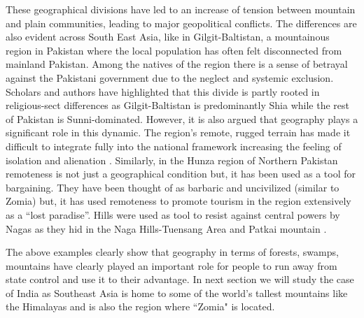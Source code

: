 \begin{sloppypar}
These geographical divisions have led to an increase of tension between mountain and plain communities,  leading to major geopolitical conflicts. The differences are also evident across South East Asia, like in Gilgit\hyp{}Baltistan, a mountainous region in Pakistan where the local population has often felt disconnected from mainland Pakistan. Among the natives of the region there is a sense of betrayal  against the Pakistani government due to the neglect and systemic exclusion. Scholars and authors have highlighted that this divide is partly rooted in religious\hyp{}sect differences as Gilgit\hyp{}Baltistan is predominantly Shia while the rest of Pakistan is  Sunni\hyp{}dominated. However, it is also argued that geography plays a significant role in this dynamic. The region's remote, rugged terrain has  made it difficult to integrate fully into the national framework  increasing the feeling of isolation and alienation \citep{ali2019delusional}. Similarly, in the Hunza region of Northern Pakistan  remoteness is not just a geographical condition but, it has been used as a tool for bargaining. They have been thought of as barbaric and uncivilized  (similar to Zomia) but, it has used remoteness to promote tourism in the region extensively as a \enquote{lost paradise}. Hills were used as tool to resist against central powers by Nagas as they hid in the Naga Hills\hyp{}Tuensang Area and Patkai mountain \citep{kapai2020spatial}.  

The above examples clearly show that geography in terms of forests, swamps, mountains have clearly played an important role for people to run away from state control and use it to their advantage. In next section we will study the case of India as Southeast Asia is home to some of the world's tallest mountains like the Himalayas and is also the region where ``Zomia" is located.


\end{sloppypar}
